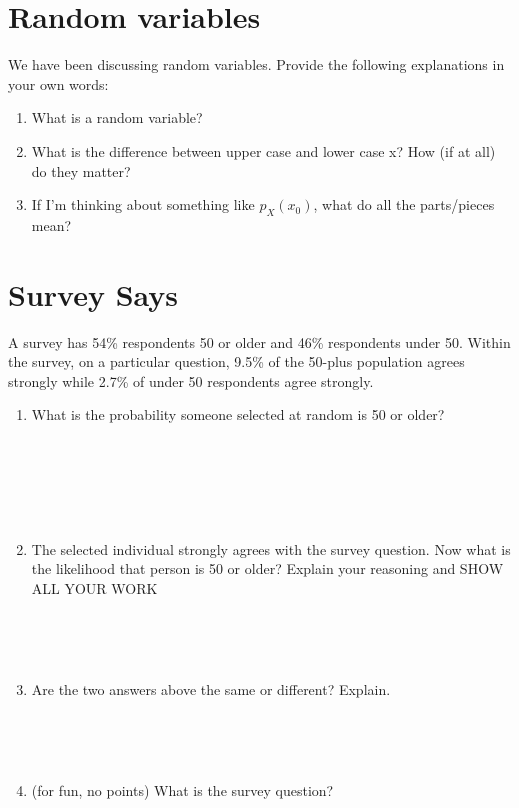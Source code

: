 \documentclass[
]{article}
\providecommand{\tightlist}{%
  \setlength{\itemsep}{0pt}\setlength{\parskip}{0pt}}
\begin{document}
\section{Random variables}\label{random-variables}

We have been discussing random variables. Provide the following
explanations in your own words:

\begin{enumerate}
\def\labelenumi{\alph{enumi}.}
\tightlist
\item
  What is a random variable?
\item
  What is the difference between upper case and lower case x? How (if at
  all) do they matter?
\item
  If I'm thinking about something like \(p_X(x_0)\), what do all the
  parts/pieces mean?
\end{enumerate}

\section{Survey Says}\label{survey-says}

A survey has 54\% respondents 50 or older and 46\% respondents under 50.
Within the survey, on a particular question, 9.5\% of the 50-plus
population agrees strongly while 2.7\% of under 50 respondents agree
strongly.

\begin{enumerate}
\def\labelenumi{\arabic{enumi}.}
\item
  What is the probability someone selected at random is 50 or older? ~
  ~\\
  \strut ~\\
  \strut ~\\
  \strut \\
\item
  The selected individual strongly agrees with the survey question. Now
  what is the likelihood that person is 50 or older? Explain your
  reasoning and SHOW ALL YOUR WORK ~ ~\\
  \strut ~\\
  \strut ~\\
\item
  Are the two answers above the same or different? Explain. ~ ~\\
  \strut ~\\
  \strut ~\\
\item
  (for fun, no points) What is the survey question?
\end{enumerate}
\end{document}
